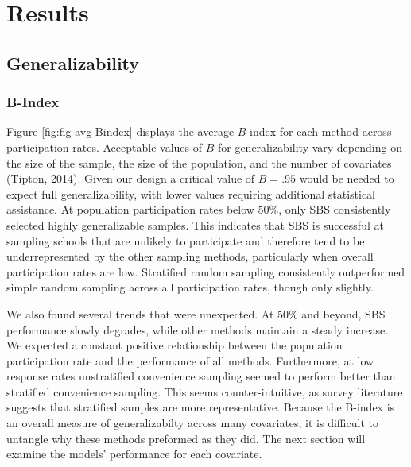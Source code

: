 \documentclass[man,floatsintext]{apa6}
\begin{document}
\hypertarget{results}{%
\section{Results}\label{results}}

\hypertarget{generalizability-1}{%
\subsection{Generalizability}\label{generalizability-1}}

\hypertarget{b-index}{%
\subsubsection{B-Index}\label{b-index}}

Figure \ref{fig:fig-avg-Bindex} displays the average \(B\)-index for each method across participation rates. Acceptable values of \(B\) for generalizability vary depending on the size of the sample, the size of the population, and the number of covariates (Tipton, 2014). Given our design a critical value of \(B = .95\) would be needed to expect full generalizability, with lower values requiring additional statistical assistance. At population participation rates below 50\%, only SBS consistently selected highly generalizable samples. This indicates that SBS is successful at sampling schools that are unlikely to participate and therefore tend to be underrepresented by the other sampling methods, particularly when overall participation rates are low. Stratified random sampling consistently outperformed simple random sampling across all participation rates, though only slightly.

We also found several trends that were unexpected. At 50\% and beyond, SBS performance slowly degrades, while other methods maintain a steady increase. We expected a constant positive relationship between the population participation rate and the performance of all methods. Furthermore, at low response rates unstratified convenience sampling seemed to perform better than stratified convenience sampling. This seems counter-intuitive, as survey literature suggests that stratified samples are more representative. Because the B-index is an overall measure of generalizabilty across many covariates, it is difficult to untangle why these methods preformed as they did. The next section will examine the models' performance for each covariate.
\end{document}
